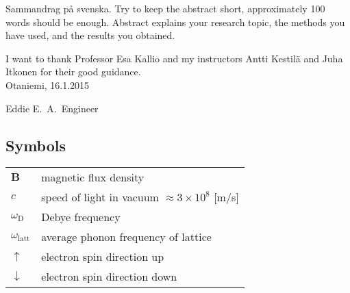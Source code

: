 \documentclass[english,12pt,a4paper,pdftex,elec,utf8]{aaltothesis}
\begin{document}
\newpage
%
%
\begin{abstractpage}[swedish]
 Sammandrag p\aa{} svenska.
 Try to keep the abstract short, approximately 
 100 words should be enough. Abstract explains your research topic, 
 the methods you have used, and the results you obtained.  
\end{abstractpage}

I want to thank Professor Esa Kallio
and my instructors Antti Kestilä and Juha Itkonen for their 
good guidance.\\

\vspace{5cm}
Otaniemi, 16.1.2015

\vspace{5mm}
{\hfill Eddie E.\ A.\ Engineer \hspace{1cm}}

\newpage


\thesistableofcontents



\subsection*{Symbols}

\begin{tabular}{ll}
$\mathbf{B}$  & magnetic flux density  \\
$c$              & speed of light in vacuum $\approx 3\times10^8$ [m/s]\\
$\omega_{\mathrm{D}}$    & Debye frequency \\
$\omega_{\mathrm{latt}}$ & average phonon frequency of lattice \\
$\uparrow$       & electron spin direction up\\
$\downarrow$     & electron spin direction down
\end{tabular}
\end{document}
